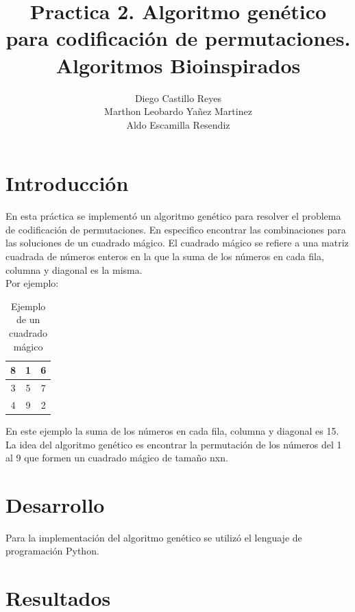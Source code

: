\documentclass{report}
\title{\Huge{\textbf{Practica 2. Algoritmo genético para codificación de permutaciones.}}\\
\Large{\textbf{Algoritmos Bioinspirados}}}
\author{Diego Castillo Reyes\\Marthon Leobardo Yañez Martinez\\Aldo Escamilla Resendiz}
\begin{document}
    \maketitle
    \tableofcontents
    \newpage

    \section{Introducción}
    En esta práctica se implementó un algoritmo genético para resolver el problema de codificación de 
    permutaciones. En especifico encontrar las combinaciones para las soluciones de un cuadrado mágico.
    El cuadrado mágico se refiere a una matriz cuadrada de números enteros en la que la suma de los números 
    en cada fila, columna y diagonal es la misma.\\

    Por ejemplo: 
    \begin{table}[H]
        \centering
        \begin{tabular}{|c|c|c|}
            \hline
            8 & 1 & 6\\
            \hline
            3 & 5 & 7\\
            \hline
            4 & 9 & 2\\
            \hline
   
        \end{tabular}
        \caption{Ejemplo de un cuadrado mágico}
    \end{table}
    En este ejemplo la suma de los números en cada fila, columna y diagonal es 15.\\
    La idea del algoritmo genético es encontrar la permutación de los números del 
    1 al 9 que formen un cuadrado mágico de tamaño nxn.\\

    \section{Desarrollo}
    Para la implementación del algoritmo genético se utilizó el lenguaje de programación Python.
    

    \section{Resultados}
\end{document}
